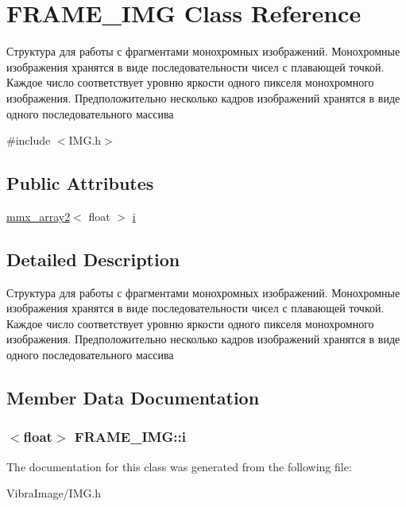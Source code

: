 \hypertarget{class_f_r_a_m_e___i_m_g}{\section{F\+R\+A\+M\+E\+\_\+\+I\+M\+G Class Reference}
\label{class_f_r_a_m_e___i_m_g}
}


Структура для работы с фрагментами монохромных изображений. Монохромные изображения хранятся в виде последовательности чисел с плавающей точкой. Каждое число соответствует уровню яркости одного пикселя монохромного изображения. Предположительно несколько кадров изображений хранятся в виде одного последовательного массива  




{\ttfamily \#include $<$I\+M\+G.\+h$>$}

\subsection*{Public Attributes}
\begin{DoxyCompactItemize}
\item 
\hyperlink{classmmx__array2}{mmx\+\_\+array2}$<$ float $>$ \hyperlink{class_f_r_a_m_e___i_m_g_a162861222fd1c92164b564709c0afb0e}{i}
\end{DoxyCompactItemize}


\subsection{Detailed Description}
Структура для работы с фрагментами монохромных изображений. Монохромные изображения хранятся в виде последовательности чисел с плавающей точкой. Каждое число соответствует уровню яркости одного пикселя монохромного изображения. Предположительно несколько кадров изображений хранятся в виде одного последовательного массива 



\subsection{Member Data Documentation}
\hypertarget{class_f_r_a_m_e___i_m_g_a162861222fd1c92164b564709c0afb0e}{
\subsubsection[{i}]{$<$float$>$ F\+R\+A\+M\+E\+\_\+\+I\+M\+G\+::i}}\label{class_f_r_a_m_e___i_m_g_a162861222fd1c92164b564709c0afb0e}






The documentation for this class was generated from the following file\+:\begin{DoxyCompactItemize}
\item 
Vibra\+Image/I\+M\+G.\+h\end{DoxyCompactItemize}
